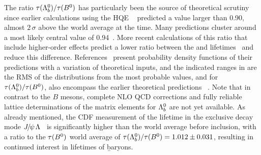 The ratio $\tau(\Lambda_b^0)/\tau(B^0)$ has particularly
been the source of theoretical
scrutiny since earlier calculations using the HQE
~\cite{Shifman:1986mx,*Chay:1990da,*Bigi:1992su,*Bigi:1992su_erratum,Voloshin:1999pz,*Guberina:1999bw,*Neubert:1996we,*Bigi:1997fj}
predicted a value larger than 0.90, almost $2\,\sigma$ 
above the world average at the time. 
Many predictions cluster around a most likely central value
of 0.94~\cite{Uraltsev:1996ta,*Pirjol:1998ur,*Colangelo:1996ta,*DiPierro:1999tb}.
More recent calculations
of this ratio that include higher-order effects predict a
lower ratio between the
\Lb and \Bd lifetimes~\cite{Tarantino:2003qw,*Gabbiani:2003pq,Gabbiani:2004tp}
and reduce this difference.
References~\cite{Tarantino:2003qw,*Gabbiani:2003pq,Gabbiani:2004tp} present probability density functions
of their predictions with a variation of theoretical inputs, and the
indicated ranges in 
are the RMS of the distributions from the most probable values, and for 
$\tau(\Lambda_b^0)/\tau(B^0)$, also encompass the earlier theoretical predictions%
~\cite{Shifman:1986mx,*Chay:1990da,*Bigi:1992su,*Bigi:1992su_erratum,Voloshin:1999pz,*Guberina:1999bw,*Neubert:1996we,*Bigi:1997fj,Uraltsev:1996ta,*Pirjol:1998ur,*Colangelo:1996ta,*DiPierro:1999tb}.
Note that in contrast to the $B$ mesons, complete NLO QCD
corrections and
fully reliable lattice
determinations of the matrix elements for $\Lambda_b^0$ are not
yet available.
As already mentioned, the CDF measurement of the \Lb lifetime
in the exclusive decay mode ${J\mskip -3mu/\mskip -2mu\psi\mskip 2mu} \Lambda$~\cite{Aaltonen:2014wfa,*Aaltonen:2014wfa_cont} 
is significantly 
higher than the world average before inclusion, with a ratio
to the $\tau(B^0)$ world average of 
$\tau(\Lambda_b^0)/\tau(B^0) = 1.012 \pm 0.031$, 
%
resulting in continued interest in lifetimes of \b baryons.


